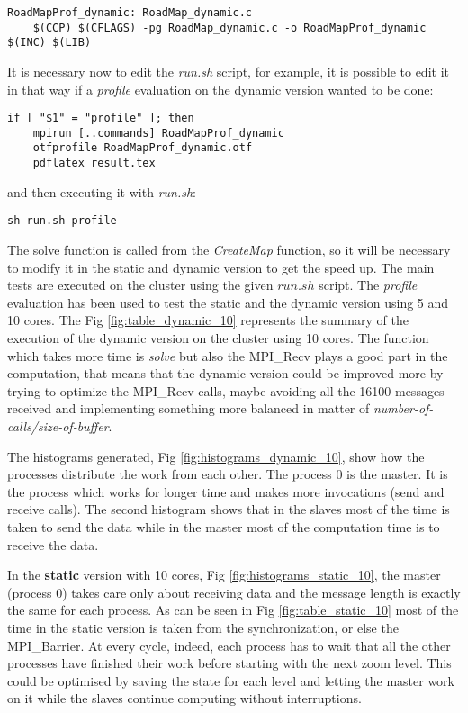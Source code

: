 \documentclass[11pt,conference]{IEEEtran}
\begin{document}
\begin{lstlisting}
RoadMapProf_dynamic: RoadMap_dynamic.c
	$(CCP) $(CFLAGS) -pg RoadMap_dynamic.c -o RoadMapProf_dynamic $(INC) $(LIB)
\end{lstlisting}
It is necessary now to edit the \textit{run.sh} script, for example, it is possible to edit it in that way if a \textit{profile} evaluation on the dynamic version wanted to be done:

\begin{lstlisting}
if [ "$1" = "profile" ]; then
	mpirun [..commands] RoadMapProf_dynamic
	otfprofile RoadMapProf_dynamic.otf
	pdflatex result.tex
\end{lstlisting}
and then executing it with \textit{run.sh}:

\begin{lstlisting}
sh run.sh profile
\end{lstlisting}
The solve function is called from the \textit{CreateMap} function, so it will be necessary to modify it in the static and dynamic version to get the speed up.
The main tests are executed on the cluster using the given $run.sh$ script.
The \textit{profile} evaluation has been used to test the static and the dynamic version using 5 and 10 cores.
\newline
The Fig \ref{fig:table_dynamic_10} represents the summary of the execution of the dynamic version on the cluster using 10 cores. The function which takes more time is \textit{solve} but also the MPI\_Recv plays a good part in the computation, that means that the dynamic version could be improved more by trying to optimize the MPI\_Recv calls, maybe avoiding all the 16100 messages received and implementing something more balanced in matter of \textit{number-of-calls/size-of-buffer}.



The histograms generated, Fig \ref{fig:histograms_dynamic_10}, show how the processes distribute the work from each other. The process 0 is the master. It is the process which works for longer time and makes more invocations (send and receive calls). The second histogram shows that in the slaves most of the time is taken to send the data while in the master most of the computation time is to receive the data.


In the \textbf{static} version with 10 cores, Fig \ref{fig:histograms_static_10}, the master (process 0) takes care only about receiving data and the message length is exactly the same for each process. As can be seen in Fig \ref{fig:table_static_10} most of the time in the static version is taken from the synchronization, or else the MPI\_Barrier. At every cycle, indeed, each process has to wait that all the other processes have finished their work before starting with the next zoom level. This could be optimised by saving the state for each level and letting the master work on it while the slaves continue computing without interruptions.
\newline
\end{document}
